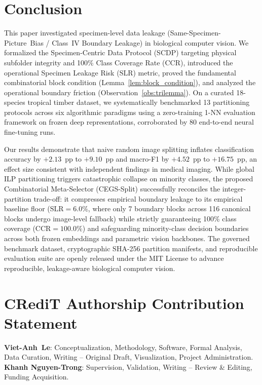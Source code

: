 \documentclass[a4paper,fleqn]{cas-sc}
\begin{document}
\section{Conclusion}
\label{sec:conclusion}

This paper investigated specimen-level data leakage (\mbox{Same-Specimen-Picture Bias} / Class~IV Boundary Leakage) in biological computer vision. We formalized the Specimen-Centric Data Protocol (SCDP) targeting physical subfolder integrity and 100\% Class Coverage Rate ($\mathrm{CCR}$), introduced the operational Specimen Leakage Risk ($\mathrm{SLR}$) metric, proved the fundamental combinatorial block condition (Lemma~\ref{lem:block_condition}), and analyzed the operational boundary friction (Observation~\ref{obs:trilemma}). On a curated 18-species tropical timber dataset, we systematically benchmarked 13 partitioning protocols across six algorithmic paradigms using a zero-training 1-NN evaluation framework on frozen deep representations, corroborated by 80 end-to-end neural fine-tuning runs.

Our results demonstrate that naive random image splitting inflates classification accuracy by $+2.13$~pp to $+9.10$~pp and macro-F1 by $+4.52$~pp to $+16.75$~pp, an effect size consistent with independent findings in medical imaging. While global ILP partitioning triggers catastrophic collapse on minority classes, the proposed Combinatorial Meta-Selector (CEGS-Split) successfully reconciles the integer-partition trade-off: it compresses empirical boundary leakage to its empirical baseline floor ($\mathrm{SLR} = 6.0\%$, where only 7 boundary blocks across 116 canonical blocks undergo image-level fallback) while strictly guaranteeing 100\% class coverage ($\mathrm{CCR} = 100.0\%$) and safeguarding minority-class decision boundaries across both frozen embeddings and parametric vision backbones. The governed benchmark dataset, cryptographic SHA-256 partition manifests, and reproducible evaluation suite are openly released under the MIT License to advance reproducible, leakage-aware biological computer vision.

\section*{CRediT Authorship Contribution Statement}
\textbf{\mbox{Viet-Anh Le}}: Conceptualization, Methodology, Software, Formal Analysis, Data Curation, Writing -- Original Draft, Visualization, Project Administration.
\textbf{Khanh Nguyen-Trong}: Supervision, Validation, Writing -- Review \& Editing, Funding Acquisition.
\end{document}
